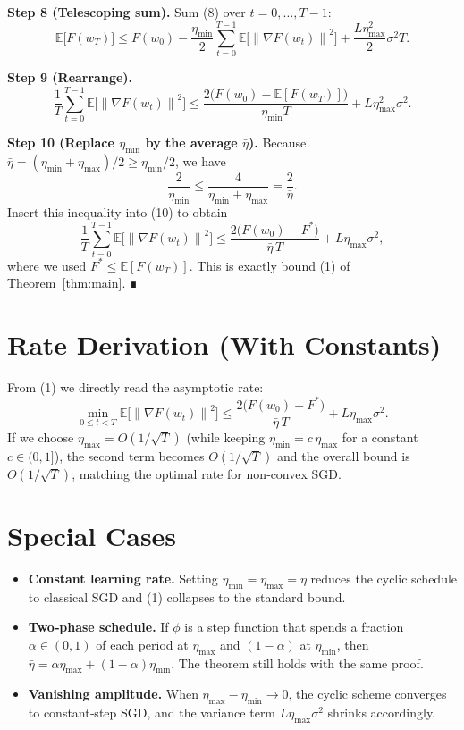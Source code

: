 \documentclass{article}
\newcommand{\E}{\mathbb{E}}
\newcommand{\norm}[1]{\left\|#1\right\|}
\begin{document}
\noindent\textbf{Step 8 (Telescoping sum).}  
Sum (8) over $t=0,\dots,T-1$:
\[
\E\!\big[F(w_{T})\big]
\le F(w_{0})
-\frac{\eta_{\min}}{2}\sum_{t=0}^{T-1}\E\!\big[\norm{\nabla F(w_{t})}^{2}\big]
+ \frac{L\eta_{\max}^{2}}{2}\sigma^{2}T .
\tag{9}
\]

\noindent\textbf{Step 9 (Rearrange).}
\[
\frac{1}{T}\sum_{t=0}^{T-1}\E\!\big[\norm{\nabla F(w_{t})}^{2}\big]
\le
\frac{2\big(F(w_{0})- \E[F(w_{T})]\big)}{\eta_{\min}T}
+L\eta_{\max}^{2}\sigma^{2}.
\tag{10}
\]

\noindent\textbf{Step 10 (Replace $\eta_{\min}$ by the average $\bar{\eta}$).}  
Because $\bar{\eta}= (\eta_{\min}+\eta_{\max})/2\ge \eta_{\min}/2$, we have
\[
\frac{2}{\eta_{\min}} \le \frac{4}{\eta_{\min}+\eta_{\max}} = \frac{2}{\bar{\eta}} .
\]
Insert this inequality into (10) to obtain
\[
\frac{1}{T}\sum_{t=0}^{T-1}\E\!\big[\norm{\nabla F(w_{t})}^{2}\big]
\le
\frac{2\big(F(w_{0})-F^{*}\big)}{\bar{\eta}\,T}
+L\eta_{\max}\sigma^{2},
\]
where we used $F^{*}\le \E[F(w_{T})]$.  This is exactly bound (1) of Theorem~\ref{thm:main}. ∎

\section*{Rate Derivation (With Constants)}
From (1) we directly read the asymptotic rate:
\[
\min_{0\le t<T}\E\!\big[\norm{\nabla F(w_{t})}^{2}\big]
\le
\frac{2\big(F(w_{0})-F^{*}\big)}{\bar{\eta}\,T}
+L\eta_{\max}\sigma^{2}.
\]
If we choose $\eta_{\max}=O(1/\sqrt{T})$ (while keeping $\eta_{\min}=c\,\eta_{\max}$ for a constant $c\in(0,1]$), the second term becomes $O(1/\sqrt{T})$ and the overall bound is $O(1/\sqrt{T})$, matching the optimal rate for non‑convex SGD.

\section*{Special Cases}
\begin{itemize}
\item \textbf{Constant learning rate.}  Setting $\eta_{\min}=\eta_{\max}=\eta$ reduces the cyclic schedule to classical SGD and (1) collapses to the standard bound.
\item \textbf{Two‑phase schedule.}  If $\phi$ is a step function that spends a fraction $\alpha\in(0,1)$ of each period at $\eta_{\max}$ and $(1-\alpha)$ at $\eta_{\min}$, then $\bar{\eta}= \alpha\eta_{\max}+(1-\alpha)\eta_{\min}$.  The theorem still holds with the same proof.
\item \textbf{Vanishing amplitude.}  When $\eta_{\max}-\eta_{\min}\to0$, the cyclic scheme converges to constant‑step SGD, and the variance term $L\eta_{\max}\sigma^{2}$ shrinks accordingly.
\end{itemize}
\end{document}
